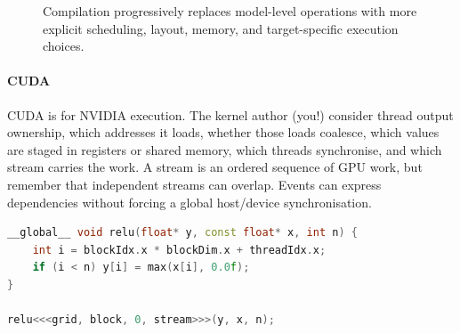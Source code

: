 \begin{figure}[H]
\centering
{}
\caption{Compilation progressively replaces model-level operations with more explicit scheduling, layout, memory, and target-specific execution choices.}
\label{fig:compiler-lowering}
\end{figure}

\paragraph{CUDA}
CUDA is for NVIDIA execution.
The kernel author (you!) consider thread output ownership, which addresses it loads, whether those loads coalesce, which values are staged in registers or shared memory, which threads synchronise, and which stream carries the work.
A stream is an ordered sequence of GPU work, but remember that independent streams can overlap.
Events can express dependencies without forcing a global host/device synchronisation.

\begin{lstlisting}[language=C++,caption={CUDA exposes thread ownership and launch geometry explicitly.}]
__global__ void relu(float* y, const float* x, int n) {
    int i = blockIdx.x * blockDim.x + threadIdx.x;
    if (i < n) y[i] = max(x[i], 0.0f);
}

relu<<<grid, block, 0, stream>>>(y, x, n);
\end{lstlisting}

